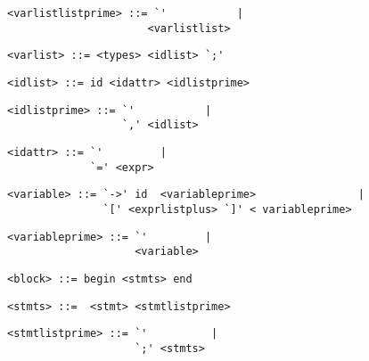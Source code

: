 \begin{footnotesize}
\begin{lstlisting}[frame=single, label={varlistlistprime}, language=pie]
<varlistlistprime> ::= `'           |
                      <varlistlist>
\end{lstlisting}

\begin{lstlisting}[frame=single, label={varlist}, language=pie]
<varlist> ::= <types> <idlist> `;'
\end{lstlisting}

\begin{lstlisting}[frame=single, label={idlist}, language=pie]
<idlist> ::= id <idattr> <idlistprime>
\end{lstlisting}

\begin{lstlisting}[frame=single, label={idlistprime}, language=pie]
<idlistprime> ::= `'           |
                  `,' <idlist>
\end{lstlisting}

\begin{lstlisting}[frame=single, label={idattr}, language=pie]
<idattr> ::= `'         |
             `=' <expr>
\end{lstlisting}

\begin{lstlisting}[frame=single, label={variable}, language=pie]
<variable> ::= `->' id  <variableprime>                |
               `[' <exprlistplus> `]' < variableprime>
\end{lstlisting}

\begin{lstlisting}[frame=single, label={variableprime}, language=pie]
<variableprime> ::= `'         |
                    <variable>
\end{lstlisting}

\begin{lstlisting}[frame=single, label={block}, language=pie]
<block> ::= begin <stmts> end
\end{lstlisting}

\begin{lstlisting}[frame=single, label={stmts}, language=pie]
<stmts> ::=  <stmt> <stmtlistprime>
\end{lstlisting}

\begin{lstlisting}[frame=single, label={stmtlistprime}, language=pie]
<stmtlistprime> ::= `'          |
                    `;' <stmts>
\end{lstlisting}


\end{footnotesize}
